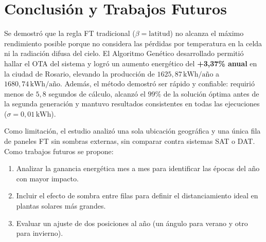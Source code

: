 \documentclass[12pt, a4paper, twocolumn]{article}
\begin{document}
\section{Conclusión y Trabajos Futuros}
Se demostró que la regla FT tradicional ($\beta = \text{latitud}$) no alcanza el máximo rendimiento posible porque no considera las pérdidas por temperatura en la celda ni la radiación difusa del cielo. El Algoritmo Genético desarrollado permitió hallar el OTA del sistema y logró un aumento energético del \textbf{+3,37\% anual} en la ciudad de Rosario, elevando la producción de $1625,87\,\text{kWh/año}$ a $1680,74\,\text{kWh/año}$. Además, el método demostró ser rápido y confiable: requirió menos de $5,8$ segundos de cálculo, alcanzó el $99\%$ de la solución óptima antes de la segunda generación y mantuvo resultados consistentes en todas las ejecuciones ($\sigma = 0,01\,\text{kWh}$).

Como limitación, el estudio analizó una sola ubicación geográfica y una única fila de paneles FT sin sombras externas, sin comparar contra sistemas SAT o DAT. Como trabajos futuros se propone:
\begin{enumerate}
    \item Analizar la ganancia energética mes a mes para identificar las épocas del año con mayor impacto.
    \item Incluir el efecto de sombra entre filas para definir el distanciamiento ideal en plantas solares más grandes.
    \item Evaluar un ajuste de dos posiciones al año (un ángulo para verano y otro para invierno).
\end{enumerate}

\vspace{0.15cm}
\end{document}
